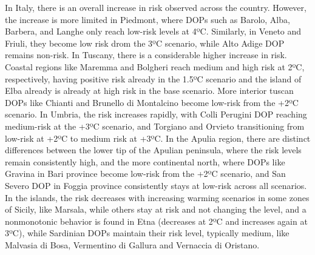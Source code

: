 In Italy, there is an overall increase in risk observed across the country.
However, the increase is more limited in Piedmont, where DOPs such as Barolo,
Alba, Barbera, and Langhe only reach low-risk levels at 4ºC. Similarly, in
Veneto and Friuli, they become low risk drom the 3ºC scenario, while Alto Adige
DOP remains non-risk. In Tuscany, there is a considerable higher increase in
risk. Coastal regions like Maremma and Bolgheri reach medium and high risk at
2ºC, respectively, having positive risk already in the 1.5ºC scenario and the
island of Elba already is already at high risk in the base scenario. More
interior tuscan DOPs like Chianti and Brunello di Montalcino become low-risk
from the +2ºC scenario. In Umbria, the risk increases rapidly, with Colli
Perugini DOP reaching medium-risk at the +3ºC scenario, and Torgiano and
Orvieto transitioning from low-risk at +2ºC to medium risk at +3ºC. In the
Apulia region, there are distinct differences between the lower tip of the
Apulian peninsula, where the risk levels remain consistently high, and the more
continental north, where DOPs like Gravina in Bari province become low-risk
from the +2ºC scenario, and San Severo DOP in Foggia province consistently
stays at low-risk across all scenarios. In the islands, the risk decreases with
increasing warming scenarios in some zones of Sicily, like Marsala, while
others stay at risk and not changing the level, and a nonmonotonic behavior is
found in Etna (decreases at 2ºC and increases again at 3ºC), while Sardinian
DOPs maintain their risk level, typically medium, like Malvasia di Bosa,
Vermentino di Gallura and Vernaccia di Oristano.

